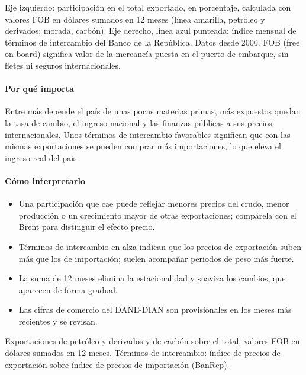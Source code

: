 \begin{leer}
Eje izquierdo: participación en el total exportado, en porcentaje, calculada con valores FOB en dólares sumados en 12 meses (línea amarilla, petróleo y derivados; morada, carbón). Eje derecho, línea azul punteada: índice mensual de términos de intercambio del Banco de la República. Datos desde 2000. FOB (free on board) significa valor de la mercancía puesta en el puerto de embarque, sin fletes ni seguros internacionales.
\end{leer}

\paragraph{Por qué importa}
Entre más depende el país de unas pocas materias primas, más expuestos quedan la tasa de cambio, el ingreso nacional y las finanzas públicas a sus precios internacionales. Unos términos de intercambio favorables significan que con las mismas exportaciones se pueden comprar más importaciones, lo que eleva el ingreso real del país.

\paragraph{Cómo interpretarlo}
\begin{itemize}
\item Una participación que cae puede reflejar menores precios del crudo, menor producción o un crecimiento mayor de otras exportaciones; compárela con el Brent para distinguir el efecto precio.
\item Términos de intercambio en alza indican que los precios de exportación suben más que los de importación; suelen acompañar periodos de peso más fuerte.
\item La suma de 12 meses elimina la estacionalidad y suaviza los cambios, que aparecen de forma gradual.
\item Las cifras de comercio del DANE-DIAN son provisionales en los meses más recientes y se revisan.
\end{itemize}
\begin{formulas}[Fórmulas]
\end{formulas}
\begin{metodo}[Metodología]
Exportaciones de petróleo y derivados y de carbón sobre el total, valores FOB en dólares sumados en 12 meses. Términos de intercambio: índice de precios de exportación sobre índice de precios de importación (BanRep).
\par{}
\end{metodo}

